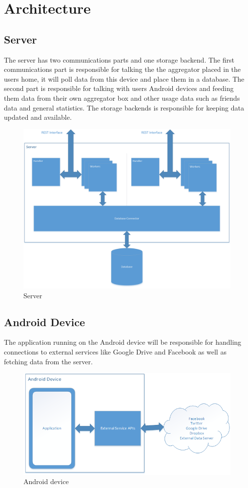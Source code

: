 \section{Architecture}
\subsection{Server}
The server has two communications parts and one storage backend. The first communications part is responsible for talking the the aggregator placed in the users home, it will poll data from this device and place them in a database. The second part is responsible for talking with users Android devices and feeding them data from their own aggregator box and other usage data such as friends data and general statistics. The storage backends is responsible for keeping data updated and available.

\begin{figure}[H]
\includegraphics[width=\textwidth]{ch/projectPlan/fig/server.png}
\caption{Server}
\end{figure}

\subsection{Android Device}
The application running on the Android device will be responsible for handling connections to external services like Google Drive and Facebook as well as fetching data from the server.

\begin{figure}[H]
\includegraphics[width=\textwidth]{ch/projectPlan/fig/androidDevice.png}
\caption{Android device}
\end{figure}

